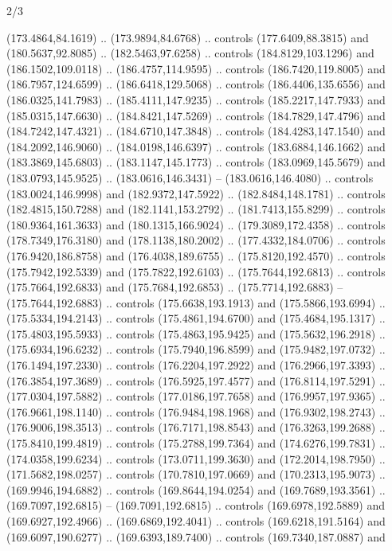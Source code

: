 \begin{flagdescription}{2/3}
\begin{scope}[shift={(0.5\flaglength,0.5)},scale=\flagwidth/320]
\begin{scope}[y=0.8pt, x=0.8pt, yscale=-1,shift={(-118.3,-146)}]
  (173.4864,84.1619) .. (173.9894,84.6768) .. controls (177.6409,88.3815) and
  (180.5637,92.8085) .. (182.5463,97.6258) .. controls (184.8129,103.1296) and
  (186.1502,109.0118) .. (186.4757,114.9595) .. controls (186.7420,119.8005) and
  (186.7957,124.6599) .. (186.6418,129.5068) .. controls (186.4406,135.6556) and
  (186.0325,141.7983) .. (185.4111,147.9235) .. controls (185.2217,147.7933) and
  (185.0315,147.6630) .. (184.8421,147.5269) .. controls (184.7829,147.4796) and
  (184.7242,147.4321) .. (184.6710,147.3848) .. controls (184.4283,147.1540) and
  (184.2092,146.9060) .. (184.0198,146.6397) .. controls (183.6884,146.1662) and
  (183.3869,145.6803) .. (183.1147,145.1773) .. controls (183.0969,145.5679) and
  (183.0793,145.9525) .. (183.0616,146.3431) -- (183.0616,146.4080) .. controls
  (183.0024,146.9998) and (182.9372,147.5922) .. (182.8484,148.1781) .. controls
  (182.4815,150.7288) and (182.1141,153.2792) .. (181.7413,155.8299) .. controls
  (180.9364,161.3633) and (180.1315,166.9024) .. (179.3089,172.4358) .. controls
  (178.7349,176.3180) and (178.1138,180.2002) .. (177.4332,184.0706) .. controls
  (176.9420,186.8758) and (176.4038,189.6755) .. (175.8120,192.4570) .. controls
  (175.7942,192.5339) and (175.7822,192.6103) .. (175.7644,192.6813) .. controls
  (175.7664,192.6833) and (175.7684,192.6853) .. (175.7714,192.6883) --
  (175.7644,192.6883) .. controls (175.6638,193.1913) and (175.5866,193.6994) ..
  (175.5334,194.2143) .. controls (175.4861,194.6700) and (175.4684,195.1317) ..
  (175.4803,195.5933) .. controls (175.4863,195.9425) and (175.5632,196.2918) ..
  (175.6934,196.6232) .. controls (175.7940,196.8599) and (175.9482,197.0732) ..
  (176.1494,197.2330) .. controls (176.2204,197.2922) and (176.2966,197.3393) ..
  (176.3854,197.3689) .. controls (176.5925,197.4577) and (176.8114,197.5291) ..
  (177.0304,197.5882) .. controls (177.0186,197.7658) and (176.9957,197.9365) ..
  (176.9661,198.1140) .. controls (176.9484,198.1968) and (176.9302,198.2743) ..
  (176.9006,198.3513) .. controls (176.7171,198.8543) and (176.3263,199.2688) ..
  (175.8410,199.4819) .. controls (175.2788,199.7364) and (174.6276,199.7831) ..
  (174.0358,199.6234) .. controls (173.0711,199.3630) and (172.2014,198.7950) ..
  (171.5682,198.0257) .. controls (170.7810,197.0669) and (170.2313,195.9073) ..
  (169.9946,194.6882) .. controls (169.8644,194.0254) and (169.7689,193.3561) ..
  (169.7097,192.6815) -- (169.7091,192.6815) .. controls (169.6978,192.5889) and
  (169.6927,192.4966) .. (169.6869,192.4041) .. controls (169.6218,191.5164) and
  (169.6097,190.6277) .. (169.6393,189.7400) .. controls (169.7340,187.0887) and

\end{scope}
\end{scope}
\end{flagdescription}
